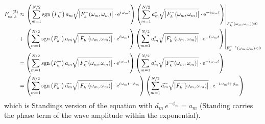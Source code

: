 \begin{align}
   {F_{\text{ex}~k}^{- (2)}} &\approx 
            \left.   \left( \sum\limits_{m=1}^{N/2} \mathrm{sgn}\left(F_k^-\right)
                        {a_m}    \sqrt{  \left| F_k^{-}(\omega_m,\omega_m)    \right|}
                        \cdot \mathrm{e}^{{i\mkern1.5mu} \omega_m t} \right)
                     \left( \sum\limits_{m=1}^{N/2}
                        {a_m^*}  \sqrt{  \left| F_k^{-}(\omega_m,\omega_m)    \right|}
                        \cdot \mathrm{e}^{- {i\mkern1.5mu} \omega_m t} \right)
              \right|_{F_{k}^{-}(\omega_m,\omega_m) > 0}    \nonumber\\
         &+ \left.  \left( \sum\limits_{m=1}^{N/2} \mathrm{sgn}\left(F_k^-\right)
                        {a_m}    \sqrt{  \left| F_k^{-}(\omega_m,\omega_m)    \right|}
                        \cdot \mathrm{e}^{{i\mkern1.5mu} \omega_m t} \right)
                     \left( \sum\limits_{m=1}^{N/2}
                        {a_m^*}  \sqrt{  \left| F_k^{-}(\omega_m,\omega_m)    \right|}
                        \cdot \mathrm{e}^{- {i\mkern1.5mu} \omega_m t} \right)
              \right|_{F_{k}^{-~*}(\omega_m,\omega_m) < 0}  \nonumber\\
         &=          \left( \sum\limits_{m=1}^{N/2} \mathrm{sgn}\left(F_k^-\right)
                        {a_m}    \sqrt{  \left| F_k^{-}(\omega_m,\omega_m)    \right|}
                        \cdot \mathrm{e}^{{i\mkern1.5mu} \omega_m t} \right)
                     \left( \sum\limits_{m=1}^{N/2}
                        {a_m^*}  \sqrt{  \left| F_k^{-}(\omega_m,\omega_m)    \right|}
                        \cdot \mathrm{e}^{- {i\mkern1.5mu} \omega_m t} \right)\nonumber\\
         &=          \left( \sum\limits_{m=1}^{N/2} \mathrm{sgn}\left(F_k^-\right)
                        \widetilde{a_m}    \sqrt{  \left| F_k^{-}(\omega_m,\omega_m)    \right|}
                        \cdot \mathrm{e}^{{i\mkern1.5mu} \omega_m t - \phi_m} \right)
                     \left( \sum\limits_{m=1}^{N/2}
                        \widetilde{a_m}  \sqrt{  \left| F_k^{-}(\omega_m,\omega_m)    \right|}
                        \cdot \mathrm{e}^{- {i\mkern1.5mu} \omega_m t + \phi_m} \right)
\label{eq:NewmanRevised4}
\end{align}
which is Standings version of the equation with $\widetilde{a_m} ~ e^{- \phi_m} = a_m$ (Standing carries the phase term of the wave amplitude within the exponential).



%         


